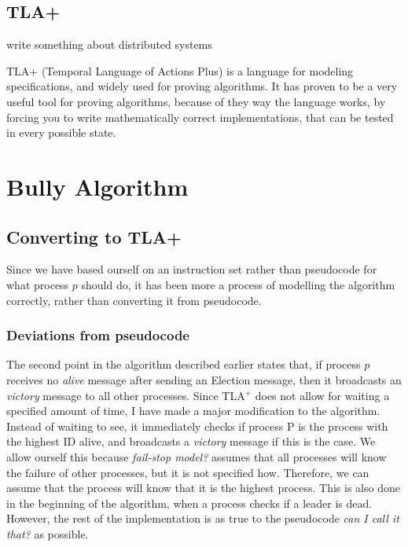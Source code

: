\documentclass{report}
\begin{document}
\section{TLA+}
\begin{callout}
  write something about distributed systems
\end{callout}

TLA+ (Temporal Language of Actions Plus) is a language for modeling specifications, and widely used for proving algorithms. It has proven to be a very useful tool for proving algorithms, because of they way the language works, by forcing you to write mathematically correct implementations, that can be tested in every possible state.

\chapter{Bully Algorithm}

\section{Converting to TLA+}
Since we have based ourself on an instruction set rather than pseudocode for what process $p$ should do, it has been more a process of modelling the algorithm correctly, rather than converting it from pseudocode.

\subsection{Deviations from pseudocode}
The second point in the algorithm described earlier states that, if process $p$ receives no \textit{alive} message after sending an Election message, then it broadcasts an \textit{victory} message to all other processes. Since TLA$^{+}$ does not allow for waiting a specified amount of time, I have made a major modification to the algorithm. Instead of waiting to see, it immediately checks if process P is the process with the highest ID alive, and broadcasts a \textit{victory} message if this is the case. We allow ourself this because \textit{fail-stop model?} assumes that all processes will know the failure of other processes, but it is not specified how. Therefore, we can assume that the process will know that it is the highest process. This is also done in the beginning of the algorithm, when a process checks if a leader is dead. However, the rest of the implementation is as true to the pseudocode \textit{can I call it that?} as possible.
\end{document}
